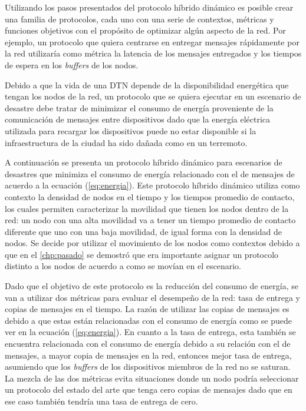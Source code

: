 Utilizando los pasos presentados del protocolo híbrido dinámico es posible crear
una familia de protocolos, cada uno con una serie de contextos, métricas y
funciones objetivos con el propósito de optimizar algún aspecto de la red. Por
ejemplo, un protocolo que quiera centrarse en entregar mensajes rápidamente por
la red utilizaría como métrica la latencia de los mensajes entregados y los
tiempos de espera en los \textit{buffers} de los nodos. 











Debido a que la vida de una DTN depende de la disponibilidad energética que
tengan los nodos de la red, un protocolo que se quiera ejecutar en un escenario
de desastre debe tratar de minimizar el consumo de energía proveniente de la
comunicación de mensajes entre dispositivos dado que la energía eléctrica
utilizada para recargar los dispositivos puede no estar disponible si la
infraestructura de la ciudad ha sido dañada como en un terremoto.

A continuación se presenta un protocolo híbrido dinámico para escenarios de
desastres que minimiza el consumo de energía relacionado con el \overhead{} de
mensajes de acuerdo a la ecuación (\ref{eq:energia}). Este protocolo híbrido
dinámico utiliza como contexto la densidad de nodos en el tiempo y los tiempos
promedio de contacto, los cuales permiten caracterizar la movilidad que tienen
los nodos dentro de la red: un nodo con una alta movilidad va a tener un tiempo
promedio de contacto diferente que uno con una baja movilidad, de igual forma
con la densidad de nodos. Se decide por utilizar el movimiento de los nodos como
contextos debido a que en el \ref{chp:pasado} se demostró que era importante
asignar un protocolo distinto a los nodos de acuerdo a como se movían en el
escenario.

Dado que el objetivo de este protocolo es la reducción del consumo de energía,
se van a utilizar dos métricas para evaluar el desempeño de la red: tasa de
entrega y copias de mensajes en el tiempo. La razón de utilizar las copias de
mensajes es debido a que estas están relacionadas con el consumo de energía como
se puede ver en la ecuación (\ref{eq:energia}). En cuanto a la tasa de entrega,
esta también se encuentra relacionada con el consumo de energía debido a su
relación con el \overhead{} de mensajes, a mayor copia de mensajes en la red,
entonces mejor tasa de entrega, asumiendo que los \textit{buffers} de los
dispositivos miembros de la red no se saturan. La mezcla de las dos métricas
evita situaciones donde un nodo podría seleccionar un protocolo del estado del
arte que tenga cero copias de mensajes dado que en ese caso también tendría una
tasa de entrega de cero.

